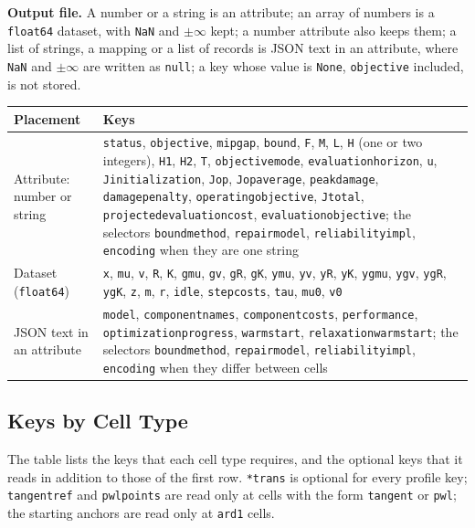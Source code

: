 \documentclass[11pt,a4paper]{article}
\makeatletter
\theoremstyle{plain}
\theoremstyle{definition}
\renewcommand{\_}{\textunderscore\allowbreak{}}
\providecommand{\rejrow}[2]{{\raggedright #1\par} & {\raggedright #2\par} \\}
\providecommand{\tabstart}[2]{\begingroup\small\begin{longtable}{@{}#1@{}}\toprule #2 \\ \midrule \endhead}
\providecommand{\tabend}{\bottomrule\end{longtable}\endgroup}
\makeatother
\begin{document}
\textbf{Output file.}
A number or a string is an attribute; an array of numbers is a \texttt{float64} dataset, with \texttt{NaN} and $\pm\infty$ kept; a number attribute also keeps them; a list of strings, a mapping or a list of records is JSON text in an attribute, where \texttt{NaN} and $\pm\infty$ are written as \texttt{null}; a key whose value is \texttt{None}, \texttt{objective} included, is not stored.

\tabstart{p{4.2cm}p{10.0cm}}{Placement & Keys}
\rejrow{Attribute: number or string}{\texttt{status}, \texttt{objective}, \texttt{mip\_gap}, \texttt{bound}, \texttt{F}, \texttt{M}, \texttt{L}, \texttt{H} (one or two integers), \texttt{H1}, \texttt{H2}, \texttt{T}, \texttt{objective\_mode}, \texttt{evaluation\_horizon}, \texttt{u}, \texttt{J\_initialization}, \texttt{J\_op}, \texttt{J\_op\_average}, \texttt{peak\_damage}, \texttt{damage\_penalty}, \texttt{operating\_objective}, \texttt{J\_total}, \texttt{projected\_evaluation\_cost}, \texttt{evaluation\_objective}; the selectors \texttt{bound\_method}, \texttt{repair\_model}, \texttt{reliability\_impl}, \texttt{encoding} when they are one string}
\rejrow{Dataset (\texttt{float64})}{\texttt{x}, \texttt{mu}, \texttt{v}, \texttt{R}, \texttt{K}, \texttt{g\_mu}, \texttt{g\_v}, \texttt{g\_R}, \texttt{g\_K}, \texttt{y\_mu}, \texttt{y\_v}, \texttt{y\_R}, \texttt{y\_K}, \texttt{y\_g\_mu}, \texttt{y\_g\_v}, \texttt{y\_g\_R}, \texttt{y\_g\_K}, \texttt{z}, \texttt{m}, \texttt{r}, \texttt{idle}, \texttt{step\_costs}, \texttt{tau}, \texttt{mu\_0}, \texttt{v\_0}}
\rejrow{JSON text in an attribute}{\texttt{model}, \texttt{component\_names}, \texttt{component\_costs}, \texttt{performance}, \texttt{optimization\_progress}, \texttt{warm\_start}, \texttt{relaxation\_warm\_start}; the selectors \texttt{bound\_method}, \texttt{repair\_model}, \texttt{reliability\_impl}, \texttt{encoding} when they differ between cells}
\tabend

\subsection{Keys by Cell Type}\label{sec:schema_fields}

The table lists the keys that each cell type requires, and the optional keys that it reads in addition to those of the first row.
\texttt{*\_trans} is optional for every profile key; \texttt{tangent\_ref} and \texttt{pwl\_points} are read only at cells with the form \texttt{tangent} or \texttt{pwl}; the starting anchors are read only at \texttt{ard1} cells.
\end{document}
